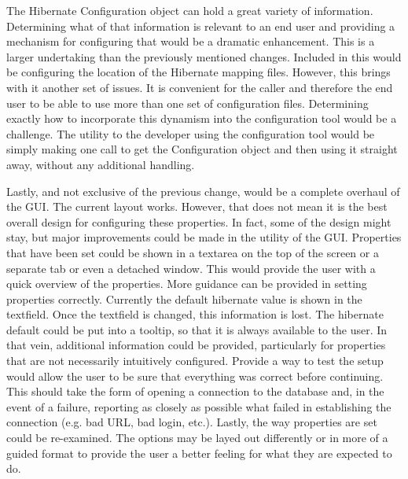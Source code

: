 The Hibernate Configuration object can hold a great variety of information. Determining what of that information is relevant to an end user and providing a mechanism for configuring that would be a dramatic enhancement. This is a larger undertaking than the previously mentioned changes. Included in this would be configuring the location of the Hibernate mapping files. However, this brings with it another set of issues. It is convenient for the caller and therefore the end user to be able to use more than one set of configuration files. Determining exactly how to incorporate this dynamism into the configuration tool would be a challenge. The utility to the developer using the configuration tool would be simply making one call to get the Configuration object and then using it straight away, without any additional handling.

Lastly, and not exclusive of the previous change, would be a complete overhaul of the GUI. The current layout works. However, that does not mean it is the best overall design for configuring these properties. In fact, some of the design might stay, but major improvements could be made in the utility of the GUI. Properties that have been set could be shown in a textarea on the top of the screen or a separate tab or even a detached window. This would provide the user with a quick overview of the properties. More guidance can be provided in setting properties correctly. Currently the default hibernate value is shown in the textfield. Once the textfield is changed, this information is lost. The hibernate default could be put into a tooltip, so that it is always available to the user. In that vein, additional information could be provided, particularly for properties that are not necessarily intuitively configured. Provide a way to test the setup would allow the user to be sure that everything was correct before continuing. This should take the form of opening a connection to the database and, in the event of a failure, reporting as closely as possible what failed in establishing the connection (e.g. bad URL, bad login, etc.). Lastly, the way properties are set could be re-examined. The options may be layed out differently or in more of a guided format to provide the user a better feeling for what they are expected to do.



